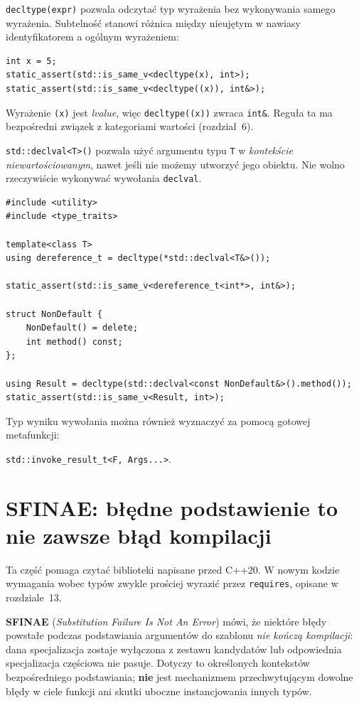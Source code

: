\texttt{decltype(expr)} pozwala odczytać typ wyrażenia bez wykonywania
samego wyrażenia. Subtelność stanowi różnica między nieujętym w nawiasy
identyfikatorem a ogólnym wyrażeniem:

\begin{lstlisting}
int x = 5;
static_assert(std::is_same_v<decltype(x), int>);
static_assert(std::is_same_v<decltype((x)), int&>);
\end{lstlisting}

Wyrażenie \texttt{(x)} jest \textit{lvalue}, więc \texttt{decltype((x))}
zwraca \texttt{int\&}. Reguła ta ma bezpośredni związek z kategoriami
wartości (rozdział~6).

\texttt{std::declval<T>()} pozwala użyć argumentu typu \texttt{T}
w \emph{kontekście niewartościowanym}, nawet jeśli nie możemy utworzyć
jego obiektu. Nie wolno rzeczywiście wykonywać wywołania
\texttt{declval}.

\begin{lstlisting}
#include <utility>
#include <type_traits>

template<class T>
using dereference_t = decltype(*std::declval<T&>());

static_assert(std::is_same_v<dereference_t<int*>, int&>);

struct NonDefault {
    NonDefault() = delete;
    int method() const;
};

using Result = decltype(std::declval<const NonDefault&>().method());
static_assert(std::is_same_v<Result, int>);
\end{lstlisting}

Typ wyniku wywołania można również wyznaczyć za pomocą gotowej metafunkcji:
\begin{center}
\texttt{std::invoke\_result\_t<F, Args...>}.
\end{center}

\section{SFINAE: błędne podstawienie to nie zawsze błąd kompilacji}
\label{sec:cpp9-sfinae}

Ta część pomaga czytać biblioteki napisane przed C++20.
W nowym kodzie wymagania wobec typów zwykle prościej wyrazić
przez \texttt{requires}, opisane w rozdziale~13.

\textbf{SFINAE} (\textit{Substitution Failure Is Not An Error}) mówi,
że niektóre błędy powstałe podczas podstawiania argumentów do szablonu
\emph{nie kończą kompilacji}: dana specjalizacja zostaje wyłączona
z zestawu kandydatów lub odpowiednia specjalizacja częściowa nie pasuje.
Dotyczy to określonych kontekstów bezpośredniego podstawiania;
\textbf{nie} jest mechanizmem przechwytującym dowolne błędy w ciele funkcji
ani skutki uboczne instancjowania innych typów.

